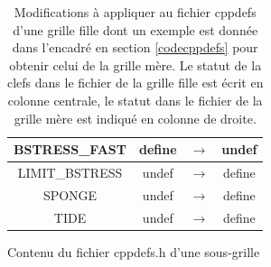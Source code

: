 \documentclass[10pt,a4paper,titlepage]{article}
\begin{document}
    \begin{table}[h!]
        \centering
        \begin{tabular}{c | c c c}
            BSTRESS\_FAST & define & $\rightarrow$ & {\color{red}undef}\\
            \hline
            LIMIT\_BSTRESS & undef & $\rightarrow$ & {\color{green}define}\\
            \hline
            SPONGE & undef & $\rightarrow$ & {\color{green}define}\\
            \hline
            TIDE & undef & $\rightarrow$ & {\color{green}define}\\
        \end{tabular}
        \caption{
            Modifications à appliquer au fichier cppdefs d'une grille fille dont un exemple est donnée dans l'encadré en section \ref{codecppdefs} pour obtenir celui de la grille mère.
            Le statut de la clefs dans le fichier de la grille fille est écrit en colonne centrale, le statut dans le fichier de la grille mère est indiqué en colonne de droite.
        }
        \label{table:cppdefs_mere}
    \end{table}
    
    \begin{codeEnv}{{Contenu du fichier cppdefs.h d'une sous-grille\label{codecppdefs}}}
        
    \end{codeEnv}
    
\end{document}
